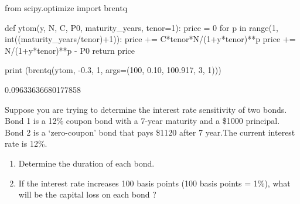 \cprotEnv\begin{solution}
\begin{ipython}
from scipy.optimize import brentq

def ytom(y, N, C, P0, maturity_years, tenor=1): 
    price = 0
	for p in range(1, int((maturity_years/tenor)+1)):
		price += C*tenor*N/(1+y*tenor)**p
	price += N/(1+y*tenor)**p - P0 
	return price

print (brentq(ytom, -0.3, 1, args=(100, 0.10, 100.917, 3, 1)))
\end{ipython}
\begin{ioutput}
0.09633636680177858
\end{ioutput}    
\end{solution}

\begin{question}
Suppose you are trying to determine the interest rate sensitivity of two bonds. Bond 1 is a 12\% coupon bond with a 7-year maturity and a \$1000 principal. Bond 2 is a ‘zero-coupon’ bond that pays \$1120 after 7 year.The current interest rate is 12\%.
\begin{enumerate}
\item Determine the duration of each bond.
\item If the interest rate increases 100 basis points (100 basis points = 1\%), what will be the capital loss on each bond ?
\end{enumerate}
\end{question}

